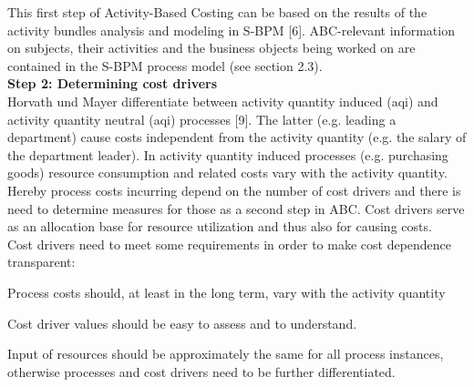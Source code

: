 This first step of Activity-Based Costing can be based on the results of the activity bundles analysis and modeling in S-BPM [6]. ABC-relevant information on subjects, their activities and the business objects being worked on are contained in the S-BPM process model (see section 2.3).
\\
\newline
\textbf{Step 2: Determining cost drivers}
\\
Horvath und Mayer differentiate between activity quantity induced (aqi) and activity quantity neutral (aqi) processes [9]. The latter (e.g. leading a department) cause costs independent from the activity quantity (e.g. the salary of the department leader). In activity quantity induced processes (e.g. purchasing goods) resource consumption and related costs vary with the activity quantity. Hereby process costs incurring depend on the number of cost drivers and there is need to determine measures for those as a second step in ABC. Cost drivers serve as an allocation base for resource utilization and thus also for causing costs.
\\
Cost drivers need to meet some requirements in order to make cost dependence transparent:
\begin{list}{-}{spacing}
	\item Process costs should, at least in the long term, vary with the activity quantity
	\item Cost driver values should be easy to assess and to understand.
	\item Input of resources should be approximately the same for all process instances, otherwise processes and cost drivers need to be further differentiated.
\end{list}

